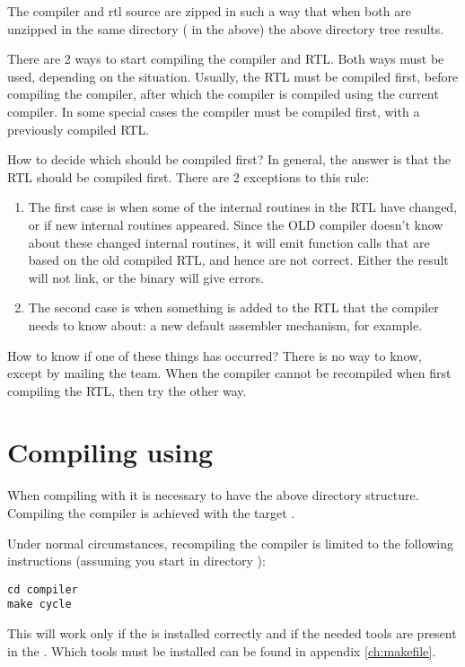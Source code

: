 The compiler and rtl source are zipped in such a way that when both are
unzipped in the same directory ( in the above) the above
directory tree results.

There are 2 ways to start compiling the compiler and RTL. Both ways must be
used, depending on the situation. Usually, the RTL must be compiled first,
before compiling the compiler, after which the compiler is compiled using
the current compiler. In some special cases the compiler must be compiled
first, with a previously compiled RTL.

How to decide which should be compiled first? In general, the answer is that
the RTL should be compiled first. There are 2 exceptions to this rule:
\begin{enumerate}
\item The first case is when some of the internal routines in the RTL
have changed, or if new internal routines appeared. Since the OLD compiler
doesn't know about these changed internal routines, it will emit function
calls that are based on the old compiled RTL, and hence are not correct.
Either the result will not link, or the binary will give errors.
\item The second case is when something is added to the RTL that the
compiler needs to know about: a new default assembler mechanism, for
example.
\end{enumerate}
How to know if one of these things has occurred? There is no way to know,
except by mailing the \fpc team. When the compiler cannot be recompiled
when first compiling the RTL, then try the other way.

\section{Compiling using }

When compiling with  it is necessary to have the above directory
structure. Compiling the compiler is achieved with the target .

Under normal circumstances, recompiling the compiler is limited to the
following instructions (assuming you start in directory ):
\begin{verbatim}
cd compiler
make cycle
\end{verbatim}
This will work only if the  is installed correctly and
if the needed tools are present in the . Which tools must be
installed can be found in appendix \ref{ch:makefile}.

